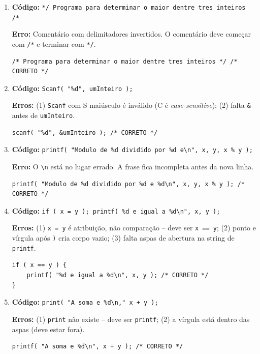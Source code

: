\documentclass[12pt,a4paper]{article}
\begin{document}
\begin{respostabox}
\begin{enumerate}[label=\textbf{\alph*)}]
\item \textbf{Código:} \texttt{*/ Programa para determinar o maior dentre tres inteiros /*}

\textbf{Erro:} Comentário com delimitadores invertidos. O comentário deve começar com \texttt{/*} e terminar com \texttt{*/}.
\begin{lstlisting}
/* Programa para determinar o maior dentre tres inteiros */ /* CORRETO */
\end{lstlisting}

\item \textbf{Código:} \texttt{Scanf( "\%d", umInteiro );}

\textbf{Erros:} (1) \texttt{Scanf} com S maiúsculo é inválido (C é \textit{case-sensitive}); (2) falta \texttt{\&} antes de \texttt{umInteiro}.
\begin{lstlisting}
scanf( "%d", &umInteiro ); /* CORRETO */
\end{lstlisting}

\item \textbf{Código:} \texttt{printf( "Modulo de \%d dividido por \%d e\textbackslash n", x, y, x \% y );}

\textbf{Erro:} O \texttt{\textbackslash n} está no lugar errado. A frase fica incompleta antes da nova linha.
\begin{lstlisting}
printf( "Modulo de %d dividido por %d e %d\n", x, y, x % y ); /* CORRETO */
\end{lstlisting}

\item \textbf{Código:} \texttt{if ( x = y ); printf( \%d e igual a \%d\textbackslash n", x, y );}

\textbf{Erros:} (1) \texttt{x = y} é atribuição, não comparação -- deve ser \texttt{x == y}; (2) ponto e vírgula após \texttt{)} cria corpo vazio; (3) falta aspas de abertura na string de \texttt{printf}.
\begin{lstlisting}
if ( x == y ) {
    printf( "%d e igual a %d\n", x, y ); /* CORRETO */
}
\end{lstlisting}

\item \textbf{Código:} \texttt{print( "A soma e \%d\textbackslash n," x + y );}

\textbf{Erros:} (1) \texttt{print} não existe -- deve ser \texttt{printf}; (2) a vírgula está dentro das aspas (deve estar fora).
\begin{lstlisting}
printf( "A soma e %d\n", x + y ); /* CORRETO */
\end{lstlisting}


\end{enumerate}
\end{respostabox}
\end{document}
